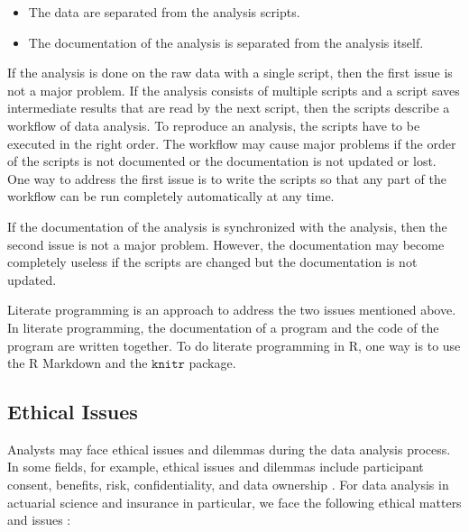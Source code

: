 \documentclass[]{book}
\theoremstyle{definition}
\theoremstyle{definition}
\theoremstyle{definition}
\theoremstyle{remark}
\begin{document}
\begin{itemize}
\item
  The data are separated from the analysis scripts.
\item
  The documentation of the analysis is separated from the analysis
  itself.
\end{itemize}

If the analysis is done on the raw data with a single script, then the
first issue is not a major problem. If the analysis consists of multiple
scripts and a script saves intermediate results that are read by the
next script, then the scripts describe a workflow of data analysis. To
reproduce an analysis, the scripts have to be executed in the right
order. The workflow may cause major problems if the order of the scripts
is not documented or the documentation is not updated or lost. One way
to address the first issue is to write the scripts so that any part of
the workflow can be run completely automatically at any time.

If the documentation of the analysis is synchronized with the analysis,
then the second issue is not a major problem. However, the documentation
may become completely useless if the scripts are changed but the
documentation is not updated.

Literate programming is an approach to address the two issues mentioned
above. In literate programming, the documentation of a program and the
code of the program are written together. To do literate programming in
R, one way is to use the R Markdown and the \(\texttt{knitr}\) package.

\subsection{Ethical Issues}\label{ethical-issues}

Analysts may face ethical issues and dilemmas during the data analysis
process. In some fields, for example, ethical issues and dilemmas
include participant consent, benefits, risk, confidentiality, and data
ownership \citep{miles2014}. For data analysis in actuarial science and
insurance in particular, we face the following ethical matters and
issues \citep{miles2014}:
\end{document}
